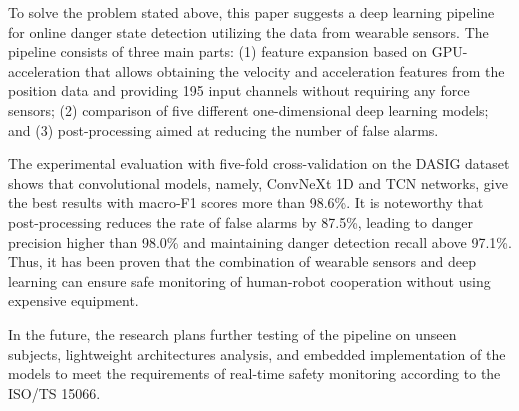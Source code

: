 \documentclass[3p,times,procedia]{elsarticle}
\begin{document}
To solve the problem stated above, this paper suggests a deep learning pipeline for online danger state detection utilizing the data from wearable sensors. The pipeline consists of three main parts: (1) feature expansion based on GPU-acceleration that allows obtaining the velocity and acceleration features from the position data and providing 195 input channels without requiring any force sensors; (2) comparison of five different one-dimensional deep learning models; and (3) post-processing aimed at reducing the number of false alarms.

The experimental evaluation with five-fold cross-validation on the DASIG dataset shows that convolutional models, namely, ConvNeXt 1D and TCN networks, give the best results with macro-F1 scores more than 98.6\%. It is noteworthy that post-processing reduces the rate of false alarms by 87.5\%, leading to danger precision higher than 98.0\% and maintaining danger detection recall above 97.1\%. Thus, it has been proven that the combination of wearable sensors and deep learning can ensure safe monitoring of human-robot cooperation without using expensive equipment.

In the future, the research plans further testing of the pipeline on unseen subjects, lightweight architectures analysis, and embedded implementation of the models to meet the requirements of real-time safety monitoring according to the ISO/TS 15066.
\newpage


\end{document}
